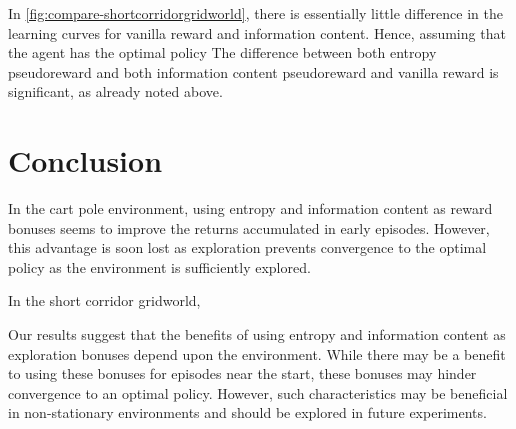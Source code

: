\documentclass{article}
\begin{document}
  In \ref{fig:compare-shortcorridorgridworld}, there is essentially little difference in the learning curves for vanilla reward and information content. Hence, assuming that the agent has the optimal policy The difference between both entropy pseudoreward and both information content pseudoreward and vanilla reward is significant, as already noted above.

  \section{Conclusion}
  In the cart pole environment, using entropy and information content as reward bonuses seems to improve the returns accumulated in early episodes. However, this advantage is soon lost as exploration prevents convergence to the optimal policy as the environment is sufficiently explored.

  In the short corridor gridworld,

  Our results suggest that the benefits of using entropy and information content as exploration bonuses depend upon the environment. While there may be a benefit to using these bonuses for episodes near the start, these bonuses may hinder convergence to an optimal policy. However, such characteristics may be beneficial in non-stationary environments and should be explored in future experiments.

  
  
\end{document}
